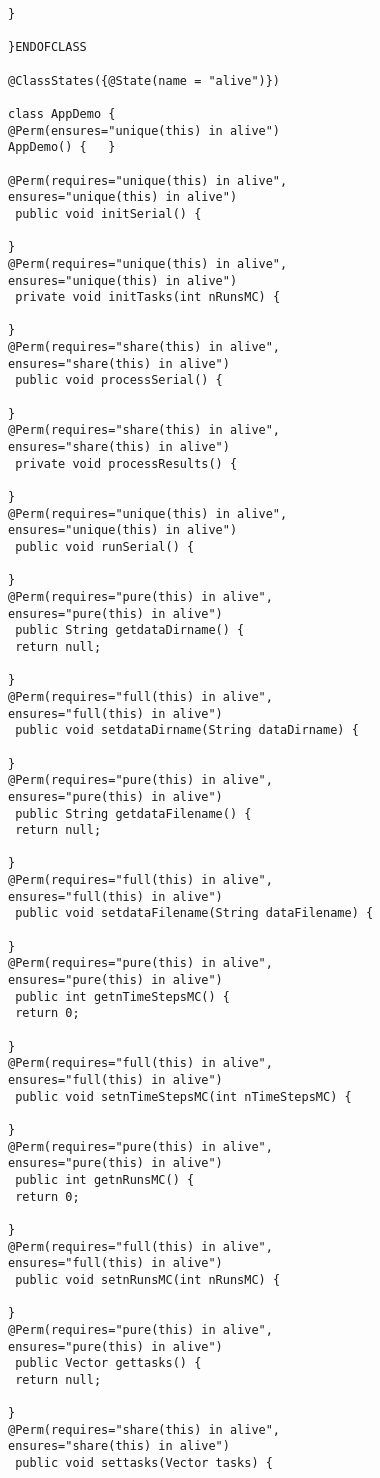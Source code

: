 \documentclass[10pt]{article}
\begin{document}
\begin{lstlisting}
} 

}ENDOFCLASS

@ClassStates({@State(name = "alive")})

class AppDemo {
@Perm(ensures="unique(this) in alive")
AppDemo() {   }

@Perm(requires="unique(this) in alive",
ensures="unique(this) in alive")
 public void initSerial() {
 
} 
@Perm(requires="unique(this) in alive",
ensures="unique(this) in alive")
 private void initTasks(int nRunsMC) {
 
} 
@Perm(requires="share(this) in alive",
ensures="share(this) in alive")
 public void processSerial() {
 
} 
@Perm(requires="share(this) in alive",
ensures="share(this) in alive")
 private void processResults() {
 
} 
@Perm(requires="unique(this) in alive",
ensures="unique(this) in alive")
 public void runSerial() {
 
} 
@Perm(requires="pure(this) in alive",
ensures="pure(this) in alive")
 public String getdataDirname() {
 return null;
 
} 
@Perm(requires="full(this) in alive",
ensures="full(this) in alive")
 public void setdataDirname(String dataDirname) {
 
} 
@Perm(requires="pure(this) in alive",
ensures="pure(this) in alive")
 public String getdataFilename() {
 return null;
 
} 
@Perm(requires="full(this) in alive",
ensures="full(this) in alive")
 public void setdataFilename(String dataFilename) {
 
} 
@Perm(requires="pure(this) in alive",
ensures="pure(this) in alive")
 public int getnTimeStepsMC() {
 return 0;
 
} 
@Perm(requires="full(this) in alive",
ensures="full(this) in alive")
 public void setnTimeStepsMC(int nTimeStepsMC) {
 
} 
@Perm(requires="pure(this) in alive",
ensures="pure(this) in alive")
 public int getnRunsMC() {
 return 0;
 
} 
@Perm(requires="full(this) in alive",
ensures="full(this) in alive")
 public void setnRunsMC(int nRunsMC) {
 
} 
@Perm(requires="pure(this) in alive",
ensures="pure(this) in alive")
 public Vector gettasks() {
 return null;
 
} 
@Perm(requires="share(this) in alive",
ensures="share(this) in alive")
 public void settasks(Vector tasks) {
 

\end{lstlisting}
\end{document}
